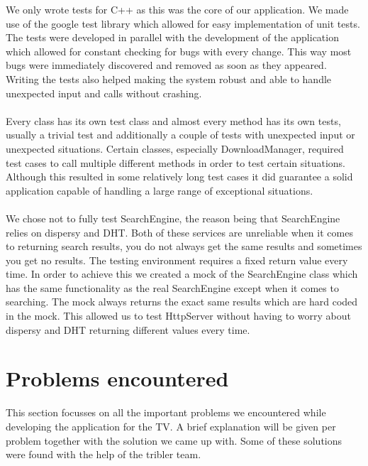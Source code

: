 We only wrote tests for C++ as this was the core of our application. We made use of the google test library which allowed for easy implementation of unit tests. The tests were developed in parallel with the development of the application which allowed for constant checking for bugs with every change. This way most bugs were immediately discovered and removed as soon as they appeared. Writing the tests also helped making the system robust and able to handle unexpected input and calls without crashing.
\\\\
Every class has its own test class and almost every method has its own tests, usually a trivial test and additionally a couple of tests with unexpected input or unexpected situations. Certain classes, especially DownloadManager, required test cases to call multiple different methods in order to test certain situations. Although this resulted in some relatively long test cases it did guarantee a solid application capable of handling a large range of exceptional situations.
\\\\
We chose not to fully test SearchEngine, the reason being that SearchEngine relies on dispersy and DHT. Both of these services are unreliable when it comes to returning search results, you do not always get the same results and sometimes you get no results. The testing environment requires a fixed return value every time. In order to achieve this we created a mock of the SearchEngine class which has the same functionality as the real SearchEngine except when it comes to searching. The mock always returns the exact same results which are hard coded in the mock. This allowed us to test HttpServer without having to worry about dispersy and DHT returning different values every time.

\section{Problems encountered}
This section focusses on all the important problems we encountered while developing the application for the TV. A brief explanation will be given per problem together with the solution we came up with.
 Some of these solutions were found with the help of the tribler team.

